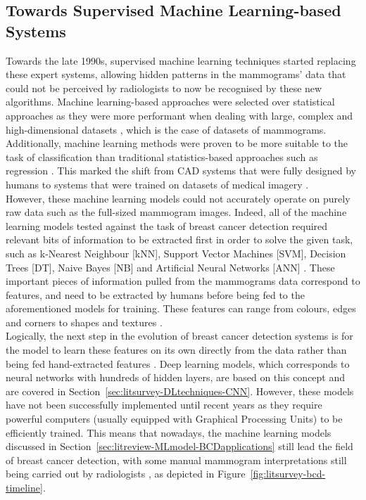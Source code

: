 \subsection{Towards Supervised Machine Learning-based Systems}

Towards the late 1990s, supervised machine learning techniques started replacing these expert systems, allowing hidden patterns in the mammograms' data that could not be perceived by radiologists to now be recognised by these new algorithms. Machine learning-based approaches were selected over statistical approaches as they were more performant when dealing with large, complex and high-dimensional datasets \cite{Yue2018}, which is the case of datasets of mammograms. Additionally, machine learning methods were proven to be more suitable to the task of classification than traditional statistics-based approaches such as regression \cite{Paliwal2009}. This marked the shift from CAD systems that were fully designed by humans to systems that were trained on datasets of medical imagery \cite{Litjens2017}.\\

However, these machine learning models could not accurately operate on purely raw data such as the full-sized mammogram images. Indeed, all of the machine learning models tested against the task of breast cancer detection required relevant bits of information to be extracted first in order to solve the given task, such as k-Nearest Neighbour [kNN], Support Vector Machines [SVM], Decision Trees [DT], Naive Bayes [NB] and Artificial Neural Networks [ANN] \cite{Yue2018} \cite{Asri2016}. These important pieces of information pulled from the mammograms data correspond to features, and need to be extracted by humans before being fed to the aforementioned models for training. These features can range from colours, edges and corners to shapes and textures \cite{Geron2019}.\\

Logically, the next step in the evolution of breast cancer detection systems is for the model to learn these features on its own directly from the data rather than being fed hand-extracted features \cite{Yala2019}. Deep learning models, which corresponds to neural networks with hundreds of hidden layers, are based on this concept and are covered in Section~\ref{sec:litsurvey-DLtechniques-CNN}. However, these models have not been successfully implemented until recent years as they require powerful computers (usually equipped with Graphical Processing Units) to be efficiently trained. This means that nowadays, the machine learning models discussed in Section~\ref{sec:litreview-MLmodel-BCDapplications} still lead the field of breast cancer detection, with some manual mammogram interpretations still being carried out by radiologists \cite{Litjens2017}, as depicted in Figure~\ref{fig:litsurvey-bcd-timeline}.

